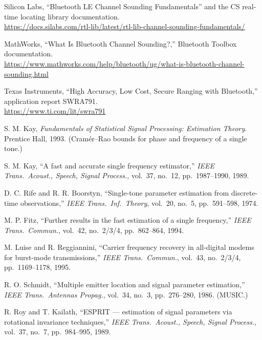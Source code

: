 \documentclass[11pt,a4paper]{article}
\begin{document}
\begin{enumerate}[label={[\arabic*]},leftmargin=2.2em,itemsep=3pt]
\item Silicon Labs, ``Bluetooth LE Channel Sounding Fundamentals'' and the CS real-time locating
  library documentation.\\
  {\small\url{https://docs.silabs.com/rtl-lib/latest/rtl-lib-channel-sounding-fundamentals/}}

\item MathWorks, ``What Is Bluetooth Channel Sounding?,'' Bluetooth Toolbox documentation.\\
  {\small\url{https://www.mathworks.com/help/bluetooth/ug/what-is-bluetooth-channel-sounding.html}}

\item Texas Instruments, ``High Accuracy, Low Cost, Secure Ranging with Bluetooth,'' application
  report SWRA791.\\
  {\small\url{https://www.ti.com/lit/swra791}}

\item S. M. Kay, \emph{Fundamentals of Statistical Signal Processing: Estimation Theory}.
  Prentice Hall, 1993. (Cram\'er--Rao bounds for phase and frequency of a single tone.)

\item S. M. Kay, ``A fast and accurate single frequency estimator,'' \emph{IEEE Trans.\ Acoust.,
  Speech, Signal Process.}, vol.\ 37, no.\ 12, pp.\ 1987--1990, 1989.

\item D. C. Rife and R. R. Boorstyn, ``Single-tone parameter estimation from discrete-time
  observations,'' \emph{IEEE Trans.\ Inf.\ Theory}, vol.\ 20, no.\ 5, pp.\ 591--598, 1974.

\item M. P. Fitz, ``Further results in the fast estimation of a single frequency,'' \emph{IEEE Trans.\
  Commun.}, vol.\ 42, no.\ 2/3/4, pp.\ 862--864, 1994.

\item M. Luise and R. Reggiannini, ``Carrier frequency recovery in all-digital modems for
  burst-mode transmissions,'' \emph{IEEE Trans.\ Commun.}, vol.\ 43, no.\ 2/3/4, pp.\ 1169--1178, 1995.

\item R. O. Schmidt, ``Multiple emitter location and signal parameter estimation,'' \emph{IEEE Trans.\
  Antennas Propag.}, vol.\ 34, no.\ 3, pp.\ 276--280, 1986. (MUSIC.)

\item R. Roy and T. Kailath, ``ESPRIT --- estimation of signal parameters via rotational invariance
  techniques,'' \emph{IEEE Trans.\ Acoust., Speech, Signal Process.}, vol.\ 37, no.\ 7,
  pp.\ 984--995, 1989.


\end{enumerate}
\end{document}
